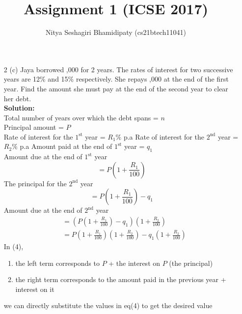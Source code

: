 \documentclass[journal,12pt,two column]{IEEEtran}
\title{Assignment 1 (ICSE 2017)}
\author{Nitya Seshagiri Bhamidipaty (cs21btech11041)}
\newcommand{\solution}{\noindent \textbf{Solution: }}
\begin{document}
\maketitle
\begin{enumerate}
\item[2 (c)] Jaya borrowed ,000 for 2 years. The rates of interest for two successive years are 12\% and 15\% respectively. She repays ,000 at the end of the first year. Find the amount she must pay at the end of the second year to clear her debt.\\
\solution \\
Total number of years over which the debt spans = $n$\\
Principal amount =  \rupee$P$\\
Rate of interest for the $1^{\text{st}}$ year =  $R_1\%$ p.a
Rate of interest for the $2^{\text{nd}}$ year =  $R_2\%$ p.a
Amount paid at the end of $1^{\text{st}}$ year = \rupee $q_1$\\ 
Amount due at the end of $1^{\text{st}}$ year
\begin{equation}
     = P\left(1+\frac{R_1}{100}\right)
\end{equation}
The principal for the $2^{\text{nd}}$ year
\begin{equation}
     = P\left(1+\frac{R_1}{100}\right) - q_1
\end{equation}
Amount due at the end of $2^{\text{nd}}$ year
\begin{align}
    &= \left (P\left(1+\frac{R_1}{100}\right) - q_1\right)\left(1 + \frac{R_2}{100}\right)
    \\
    &= P\left(1+\frac{R_1}{100}\right)\left(1+\frac{R_2}{100}\right) - q_1\left(1+\frac{R_2}{100}\right)
\end{align}
%
In (4),
\begin{enumerate}
\item the left term corresponds to $P$ + the interest on $P$ (the principal)
\item the right term corresponds to the amount paid in the previous year + interest on it
\end{enumerate}

we can directly substitute the values in eq(4) to get the desired value


\end{enumerate}
\end{document}

